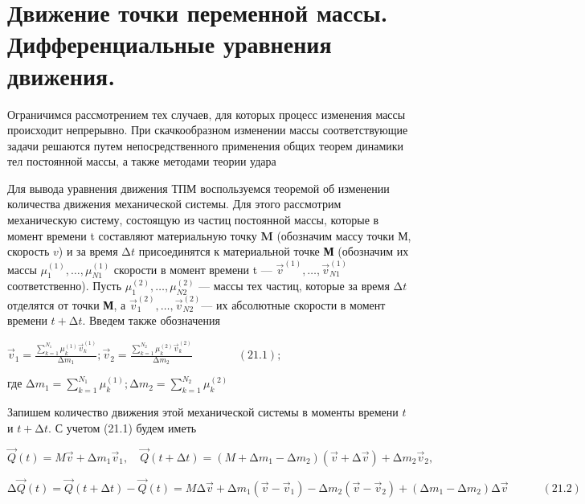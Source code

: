 {%
\section{Движение точки переменной массы. Дифференциальные уравнения движения.}
\begin{center}

\par Ограничимся рассмотрением тех случаев, для которых процесс изменения массы происходит непрерывно. При скачкообразном изменении массы соответствующие задачи решаются путем непосредственного применения общих теорем динамики тел постоянной массы, а также методами теории удара

\par Для вывода уравнения движения ТПМ воспользуемся теоремой об изменении количества движения механической системы.  Для этого рассмотрим механическую систему, состоящую из частиц постоянной массы, которые в момент времени t составляют материальную точку  \textbf{M} (обозначим массу точки $М$, скорость $v$) и за время $∆t$ присоединятся к материальной точке \textbf{М} (обозначим их массы $\mu_1^{(1)}, \dots, \mu_{N1}^{(1)}$ скорости в момент времени t — $\vec{v}^{(1)}, \dots, \vec{v}_{N1}^{(1)}$  соответственно). Пусть $\mu_1^{(2)}, \dots, \mu_{N2}^{(2)}$ — массы тех частиц,  которые за время $∆t$ отделятся от точки \textbf{М}, а $\vec{v}_1^{(2)}, \dots, \vec{v}_{N2}^{(2)}$— их абсолютные скорости в момент времени $t+∆t$. Введем также обозначения

\par $\vec{v}_1 = \frac{\sum\limits_{k=1}^{N_1} \mu_k^{(1)} \vec{v}_k^{(1)}}{∆m_1}; \vec{v}_2 = \frac{\sum\limits_{k=1}^{N_2} \mu_k^{(2)} \vec{v}_k^{(2)}}{∆m_2} \quad\quad\quad\quad (21.1);$

\par где $∆m_1 =\sum\limits_{k=1}^{N_1} \mu_k^{(1)}; ∆m_2 =\sum\limits_{k=1}^{N_2} \mu_k^{(2)}  $

\par Запишем количество движения этой механической системы в моменты времени $t$ и $t+∆t.$ С учетом (21.1) будем иметь

\par $\vec{Q}(t) = M \vec{v} + ∆m_1 \vec{v}_1, \quad \vec{Q}(t + ∆t) = (M + ∆m_1 - ∆m_2) (\vec{v} + ∆ \vec{v}) + ∆m_2 \vec{v}_2,  $

\par \quad

\par $∆ \vec{Q}(t) = \vec{Q}(t + ∆t) - \vec{Q}(t) = M ∆ \vec{v} + ∆ m_1 (\vec{v} - \vec{v}_1) - ∆ m_2 (\vec{v} - \vec{v}_2) + (∆ m_1 - ∆ m_2) ∆\vec{v} \quad\quad\quad (21.2)$ 


\end{center}}
